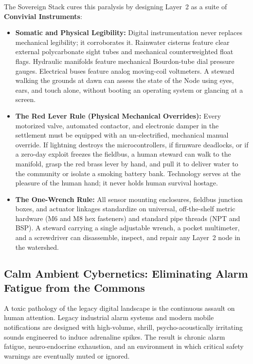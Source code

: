 The Sovereign Stack cures this paralysis by designing Layer~2 as a suite of \textbf{Convivial Instruments}:
\begin{itemize}
    \item \textbf{Somatic and Physical Legibility:} Digital instrumentation never replaces mechanical legibility; it corroborates it. Rainwater cisterns feature clear external polycarbonate sight tubes and mechanical counterweighted float flags. Hydraulic manifolds feature mechanical Bourdon-tube dial pressure gauges. Electrical buses feature analog moving-coil voltmeters. A steward walking the grounds at dawn can assess the state of the Node using eyes, ears, and touch alone, without booting an operating system or glancing at a screen.
    \item \textbf{The Red Lever Rule (Physical Mechanical Overrides):} Every motorized valve, automated contactor, and electronic damper in the settlement must be equipped with an un-electrified, mechanical manual override. If lightning destroys the microcontrollers, if firmware deadlocks, or if a zero-day exploit freezes the fieldbus, a human steward can walk to the manifold, grasp the red brass lever by hand, and pull it to deliver water to the community or isolate a smoking battery bank. Technology serves at the pleasure of the human hand; it never holds human survival hostage.
    \item \textbf{The One-Wrench Rule:} All sensor mounting enclosures, fieldbus junction boxes, and actuator linkages standardize on universal, off-the-shelf metric hardware (M6 and M8 hex fasteners) and standard pipe threads (NPT and BSP). A steward carrying a single adjustable wrench, a pocket multimeter, and a screwdriver can disassemble, inspect, and repair any Layer~2 node in the watershed.
\end{itemize}

\subsection{Calm Ambient Cybernetics: Eliminating Alarm Fatigue from the Commons}

A toxic pathology of the legacy digital landscape is the continuous assault on human attention. Legacy industrial alarm systems and modern mobile notifications are designed with high-volume, shrill, psycho-acoustically irritating sounds engineered to induce adrenaline spikes. The result is chronic alarm fatigue, neuro-endocrine exhaustion, and an environment in which critical safety warnings are eventually muted or ignored.

